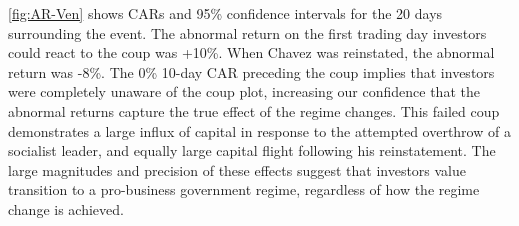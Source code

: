 \documentclass[12pt,final,fleqn]{article}
\theoremstyle{plain}
\begin{document}

\autoref{fig:AR-Ven} shows CARs and 95\% confidence intervals for the 20 days surrounding the event. The abnormal return on the first trading day investors could react to the coup was +10\%. When Chavez was reinstated, the abnormal return was -8\%. The 0\% 10-day CAR preceding the coup implies that investors were completely unaware of the coup plot, increasing our confidence that the abnormal returns capture the true effect of the regime changes. This failed coup demonstrates a large influx of capital in response to the attempted overthrow of a socialist leader, and equally large capital flight following his reinstatement.  The large magnitudes and precision of these effects suggest that investors value transition to a pro-business government regime, regardless of how the regime change is achieved. 

\end{document}
